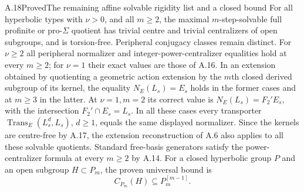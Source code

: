 \begin{claim}{A.18}{Proved}{The remaining affine solvable rigidity list and a closed bound}
For all hyperbolic types with $\nu>0$, and all $m\ge2$, the maximal $m$-step-solvable full profinite or pro-$\Sigma$ quotient has trivial centre and trivial centralizers of open subgroups, and is torsion-free. Peripheral conjugacy classes remain distinct. For $\nu\ge2$ all peripheral normalizer and integer-power-centralizer equalities hold at every $m\ge2$; for $\nu=1$ their exact values are those of A.16. In an extension obtained by quotienting a geometric action extension by the $m$th closed derived subgroup of its kernel, the equality $N_E(L_s)=E_s$ holds in the former cases and at $m\ge3$ in the latter. At $\nu=1,m=2$ its correct value is $N_E(L_s)=F_2'E_s$, with the intersection $F_2'\cap E_s=L_s$. In all these cases every transporter $\operatorname{Trans}_E(L_s^d,L_s)$, $d\ge1$, equals the same displayed normalizer. Since the kernels are centre-free by A.17, the extension reconstruction of A.6 also applies to all these solvable quotients. Standard free-basis generators satisfy the power-centralizer formula at every $m\ge2$ by A.14.
For a closed hyperbolic group $P$ and an open subgroup $H\subset P_m$, the proven universal bound is
\[
 C_{P_m}(H)\subseteq P_m^{[m-1]}.
\]
\end{claim}
